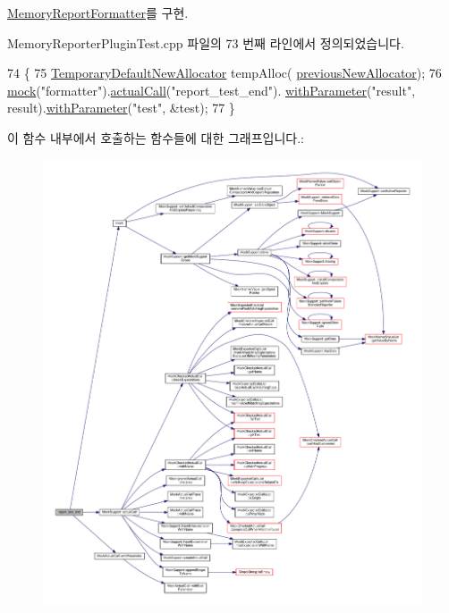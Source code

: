 \hyperlink{class_memory_report_formatter_ace6fc7f4a7c7cb5d702018d91d85ae62}{Memory\+Report\+Formatter}를 구현.



Memory\+Reporter\+Plugin\+Test.\+cpp 파일의 73 번째 라인에서 정의되었습니다.


\begin{DoxyCode}
74     \{
75         \hyperlink{class_temporary_default_new_allocator}{TemporaryDefaultNewAllocator} tempAlloc(
      \hyperlink{_memory_reporter_plugin_test_8cpp_a8462e36388a54721a0ecdc37a48784ee}{previousNewAllocator});
76         \hyperlink{_mock_support_8h_ac44b0374b926cc12a3d8b24361f8a6a7}{mock}(\textcolor{stringliteral}{"formatter"}).\hyperlink{class_mock_support_a9b0ef024cdc513368395ef23d9e3af39}{actualCall}(\textcolor{stringliteral}{"report\_test\_end"}).
      \hyperlink{class_mock_actual_call_a158f3ada8f73127b977d5353d4e4dea0}{withParameter}(\textcolor{stringliteral}{"result"}, result).\hyperlink{class_mock_actual_call_a158f3ada8f73127b977d5353d4e4dea0}{withParameter}(\textcolor{stringliteral}{"test"}, &test);
77     \}
\end{DoxyCode}


이 함수 내부에서 호출하는 함수들에 대한 그래프입니다.\+:
\nopagebreak
\begin{figure}[H]
\begin{center}
\leavevmode
\includegraphics[width=350pt]{class_mock_memory_report_formatter_aa25cde658728a8e3d7ed5b4dfa27ce94_cgraph}
\end{center}
\end{figure}


